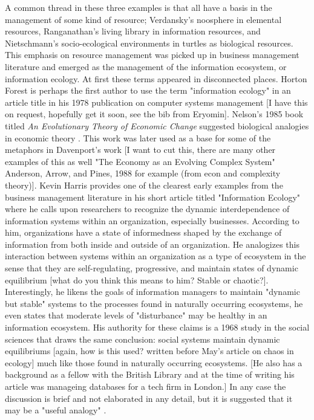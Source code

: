 A common thread in these three examples is that all have a basis in the management of some kind of resource; Verdansky's noosphere in elemental resources, Ranganathan's living library in information resources, and Nietschmann's socio-ecological environments in turtles as biological resources. This emphasis on resource management was picked up in business management literature and emerged as the management of the information ecosystem, or information ecology. At first these terms appeared in disconnected places. Horton Forest is perhaps the first author to use the term "information ecology" in an article title in his 1978 publication on computer systems management \citep{forest_1978} [I have this on request, hopefully get it soon, see the bib from Eryomin]. Nelson's 1985 book titled \textit{An Evolutionary Theory of Economic Change} suggested biological analogies in economic theory \citep{nelson_evolutionary_1985}. This work was later used as a base for some of the metaphors in Davenport's work [I want to cut this, there are many other examples of this as well "The Economy as an Evolving Complex System" Anderson, Arrow, and Pines, 1988 for example (from econ and complexity theory)]. Kevin Harris provides one of the clearest early examples from the business management literature in his short article titled "Information Ecology" where he calls upon researchers to recognize the dynamic interdependence of information systems within an organization, especially businesses. According to him, organizations have a state of informedness shaped by the exchange of information from both inside and outside of an organization. He analogizes this interaction between systems within an organization as a type of ecosystem in the sense that they are self-regulating, progressive, and maintain states of dynamic equilibrium [what do you think this means to him? Stable or chaotic?]. Interestingly, he likens the goals of information managers to maintain "dynamic but stable" systems to the processes found in naturally occurring ecosystems, he even states that moderate levels of "disturbance" may be healthy in an information ecosystem. His authority for these claims is a 1968 study in the social sciences that draws the same conclusion: social systems maintain dynamic equilibriums [again, how is this used? written before May's article on chaos in ecology] much like those found in naturally occurring ecosystems. [He also has a background as a fellow with the British Library and at the time of writing his article was manageing databases for a tech firm in London.] In any case the discussion is brief and not elaborated in any detail, but it is suggested that it may be a "useful analogy" \citep{harris_information_1989}.

